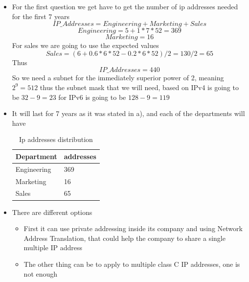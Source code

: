 \documentclass{assignment}
\begin{document}
\begin{itemize}
  \item For the first question we get have to get the number of ip addresses
    needed for the first 7 years
    $$IP\_Addresses = Engineering + Marketing + Sales$$
    $$Engineering = 5 + 1*7*52 = 369$$
    $$Marketing = 16$$
    For sales we are going to use the expected values
    $$Sales =( 6 + 0.6*6*52 - 0.2*6*52 )/ 2= 130 /2 = 65 $$
    Thus 
    $$IP\_Addresses = 440$$
    So we need a subnet for the immediately superior power of 2, meaning $2^9=
    512$ thus the subnet mask that we will need, based on IPv4 is going to be $32-9 =
    23$ for IPv6 is going to be $128-9=119$
  \item It will last for 7 years as it was stated in a), and each of the
    departments will have
    \begin{table}[h]
      \begin{center}
        \begin{tabular}[c]{l|l}
          \hline
          \multicolumn{1}{c|}{\textbf{Department}} & 
          \multicolumn{1}{c}{\textbf{addresses}} \\
          \hline
          Engineering& 369 \\
          Marketing & 16 \\
          \hline
          Sales & 65 \\
        \end{tabular}
      \caption{Ip addresses distribution}
      \end{center}
    \end{table}
  \newpage
  \item There are different options
    \begin{itemize}
      \item First it can use private addressing inside its company and using
        Network \\Address Translation, that could help the company to share a
        single multiple IP address 
      \item The other thing can be to apply to multiple class C IP addresses,
        one is not enough
          
    \end{itemize}
    
\end{itemize}
\end{document}
